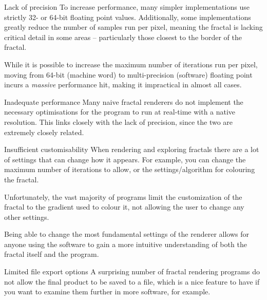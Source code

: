 \begin{greybox}{Lack of precision}
	To increase performance, many simpler implementations use strictly 32- or 64-bit floating point values. Additionally, some implementations greatly reduce the number of samples run per pixel, meaning the fractal is lacking critical detail in some areas -- particularly those closest to the border of the fractal.
	
	\vspace{0.25cm}
	
	While it is possible to increase the maximum number of iterations run per pixel, moving from 64-bit (machine word) to multi-precision (software) floating point incurs a \emph{massive} performance hit, making it impractical in almost all cases.
\end{greybox}

\begin{greybox}{Inadequate performance}
	Many naive fractal renderers do not implement the necessary optimisations for the program to run at real-time with a native resolution. This links closely with the lack of precision, since the two are extremely closely related.
\end{greybox}

\begin{greybox}{Insufficient customisability}
	When rendering and exploring fractals there are a lot of settings that can change how it appears. For example, you can change the maximum number of iterations to allow, or the settings/algorithm for colouring the fractal.
	
	\vspace{0.25cm}
	
	Unfortunately, the vast majority of programs limit the customization of the fractal to the gradient used to colour it, not allowing the user to change any other settings.
	
	\vspace{0.25cm}
	
	Being able to change the most fundamental settings of the renderer allows for anyone using the software to gain a more intuitive understanding of both the fractal itself and the program.
\end{greybox}

\begin{greybox}{Limited file export options}
	A surprising number of fractal rendering programs do not allow the final product to be saved to a file, which is a nice feature to have if you want to examine them further in more software, for example.
	
\end{greybox}

